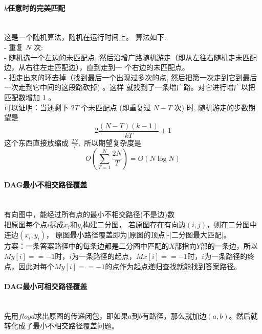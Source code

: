\paragraph{$k$任意时的完美匹配}~{}
\\
这是一个随机算法，随机在运行时间上。
算法如下:\\
- 重复 $N$ 次:\\
- 随机选一个左边的未匹配点, 然后沿增广路随机游走（即从左往右随机走未匹配边，从右往左走匹配边），直到走到一
个右边的未匹配点。\\
- 把走出来的环去掉（找到最后一个出现过多次的点, 然后把第一次走到它到最后一次走到它中间的这段路砍掉) 。这样
就找到了一条增广路。对它进行增广以把匹配数增加 1 。\\
可以证明：当还剩下 $2 T$ 个未匹配点 (即重复过 $N-T$ 次) 时, 随机游走的步数期望是
$$
2 \frac{(N-T)(k-1)}{k T}+1
$$
这个东西直接放缩成 $\frac{2 N}{T},$ 所以期望复杂度是
$$
O\left(\sum_{T=1}^{N} \frac{2 N}{T}\right)=O(N \log N)
$$
\paragraph{DAG最小不相交路径覆盖}~{}
\\
有向图中，能经过所有点的最小不相交路径(不是边)数\\
把原图每个点$i$拆成$x_i$和$y_i$构建二分图，
若原图存在有向边$(i, j)$，则在二分图中连边$(x_i, y_i)$，
原图最小路径覆盖即为|原图的顶点|-|二分图最大匹配|。\\
方案：一条答案路径中的每条边都是二分图中匹配的$X$部指向$Y$部的一条边，所以$My[i]==-1$时，$i$为一条路径的起点，$Mx[i]==-1$时，$i$为一条路径的终点，因此对每个$My[i]==-1$的点作为起点递归查找就能找到答案路径。
\paragraph{DAG最小可相交路径覆盖}~{}
\\
先用$floyd$求出原图的传递闭包，即如果$a$到$b$有路径，那么就加边$(a, b)$。然后就转化成了最小不相交路径覆盖问题。
